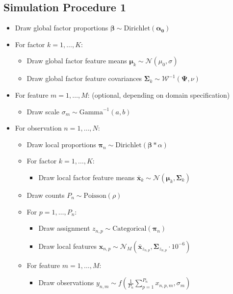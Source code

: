\documentclass[twoside,11pt]{article}
\begin{document}
\subsection{Simulation Procedure 1}
\label{app:sim1}
\begin{itemize}
    \item Draw global factor proportions $\boldsymbol{\beta} \sim \mbox{Dirichlet}(\boldsymbol{\alpha_0})$
    \item For factor $k=1,\dots,K$:
    \begin{itemize}
        \item Draw global factor feature means $\boldsymbol{\mu}_k \sim \mathcal{N}(\mu_0, \sigma)$
        \item Draw global factor feature covariances $\boldsymbol{\Sigma}_k \sim \mathcal{W}^{-1}(\boldsymbol{\Psi}, \nu)$
    \end{itemize}
    \item For feature $m=1,\dots,M$: (optional, depending on domain specification)
    \begin{itemize}
        \item Draw scale $\sigma_m \sim \mbox{Gamma}^{-1}(a, b)$
    \end{itemize}
    \item For observation $n=1,\dots,N$:
    \begin{itemize}
        \item Draw local proportions $\boldsymbol{\pi}_n \sim \mbox{Dirichlet}( \boldsymbol{\beta}*\alpha)$
        \item For factor $k=1,\dots,K$:
        \begin{itemize}
            \item Draw local factor feature means $\boldsymbol{\bar{x}}_k \sim \mathcal{N}(\boldsymbol{\mu}_k, \boldsymbol{\Sigma}_k)$
        \end{itemize}
        \item Draw counts $P_n \sim \mbox{Poisson}(\rho)$
        \item For $p=1,\dots,P_n$:
        \begin{itemize}
            \item Draw assignment $z_{n,p} \sim \mbox{Categorical}(\boldsymbol{\pi}_n)$
            \item Draw local features $\boldsymbol{x}_{n,p} \sim \mathcal{N}_M(\boldsymbol{\bar{x}}_{z_{n,p}}, \boldsymbol{\Sigma}_{z_{n,p}}\cdot10^{-6})$
        \end{itemize}
        \item For feature $m=1,\dots,M$:
        \begin{itemize}
            \item Draw observations $y_{n,m} \sim f\left(\frac{1}{P_n}\sum_{p=1}^{P_n} x_{n,p,m}, \sigma_m \right)$ 
        \end{itemize}
    \end{itemize}
\end{itemize}
\end{document}
